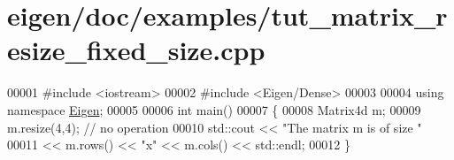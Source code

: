 \hypertarget{eigen_2doc_2examples_2tut__matrix__resize__fixed__size_8cpp_source}{}\section{eigen/doc/examples/tut\+\_\+matrix\+\_\+resize\+\_\+fixed\+\_\+size.cpp}
\label{eigen_2doc_2examples_2tut__matrix__resize__fixed__size_8cpp_source}

\begin{DoxyCode}
00001 \textcolor{preprocessor}{#include <iostream>}
00002 \textcolor{preprocessor}{#include <Eigen/Dense>}
00003 
00004 \textcolor{keyword}{using namespace }\hyperlink{namespace_eigen}{Eigen};
00005 
00006 \textcolor{keywordtype}{int} main()
00007 \{
00008   Matrix4d m;
00009   m.resize(4,4); \textcolor{comment}{// no operation}
00010   std::cout << \textcolor{stringliteral}{"The matrix m is of size "}
00011             << m.rows() << \textcolor{stringliteral}{"x"} << m.cols() << std::endl;
00012 \}
\end{DoxyCode}
